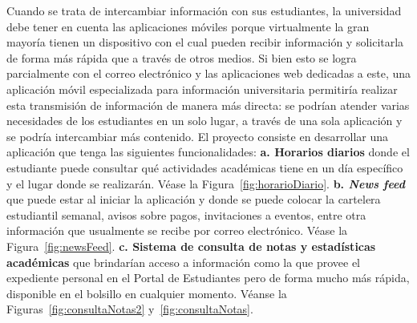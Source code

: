 \documentclass[12pt]{article}
\begin{document}
Cuando se trata de intercambiar información con sus estudiantes, la universidad debe tener en cuenta las aplicaciones móviles porque virtualmente la gran mayor\'ia tienen un dispositivo con el cual pueden recibir información y solicitarla de forma más rápida que a través de otros medios. Si bien esto se logra parcialmente con el correo electrónico y las aplicaciones web dedicadas a este, una aplicación m\'ovil especializada para información universitaria permitiría realizar esta transmisi\'on de informaci\'on de manera más directa: se podrían atender varias necesidades de los estudiantes en un solo lugar, a través de una sola aplicación y se podría intercambiar más contenido.
\newline El proyecto consiste en desarrollar una aplicación que tenga las siguientes funcionalidades: 
\newline
\newline
\textbf{a. Horarios diarios} donde el estudiante puede consultar qué actividades académicas tiene en un día específico y el lugar donde se realizarán. Véase la Figura~\ref{fig:horarioDiario}.
\newline
\newline
\textbf{b. \textit{News feed}} que puede estar al iniciar la aplicación y donde se puede colocar la cartelera estudiantil semanal, avisos sobre pagos, invitaciones a eventos, entre otra información que usualmente se recibe por correo electrónico. Véase la Figura~\ref{fig:newsFeed}.  
\newline
\newline
\textbf{c. Sistema de consulta de notas y estadísticas académicas } que brindarían acceso a información como la que provee el expediente personal en el Portal de Estudiantes pero de forma mucho más rápida, disponible en el bolsillo en cualquier momento. Véanse la Figuras~\ref{fig:consultaNotas2} y~\ref{fig:consultaNotas}.
\end{document}
